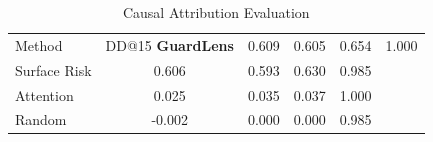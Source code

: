 \begin{table}[t]
\centering
\small
\caption{Causal Attribution Evaluation}
\label{tab:causal_eval}
\begin{tabular}{lcccc}
\toprule
Method & DD@15%
\midrule
\textbf{GuardLens} & 0.609 & 0.605 & 0.654 & 1.000 \\
Surface Risk & 0.606 & 0.593 & 0.630 & 0.985 \\
Attention & 0.025 & 0.035 & 0.037 & 1.000 \\
Random & -0.002 & 0.000 & 0.000 & 0.985 \\
\bottomrule
\end{tabular}
\end{table}